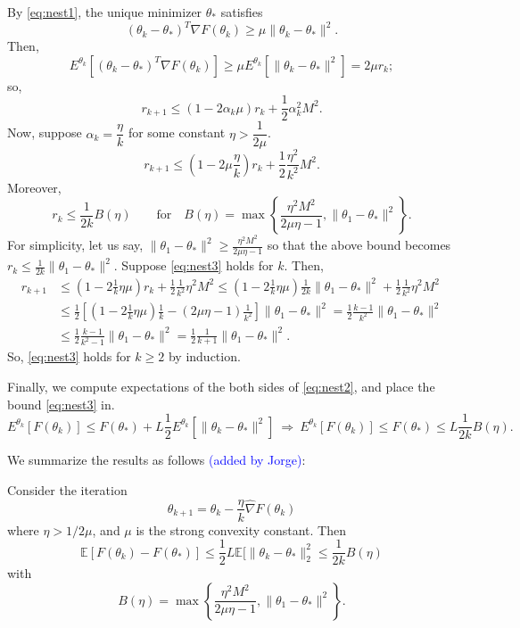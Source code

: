 \documentclass[12pt]{article}
\begin{document}
\noindent
By \eqref{eq:nest1}, the unique minimizer $\theta_\ast$ satisfies
\[
 (\theta_k - \theta_\ast)^T\nabla F(\theta_k) \geq \mu\|\theta_k - \theta_\ast\|^2.
\]
Then,
\[
 E^{\theta_k}[(\theta_k-\theta_\ast)^T\nabla F(\theta_k)] \geq \mu E^{\theta_k}[\|\theta_k - \theta_\ast\|^2] = 2\mu r_k;
\]
so,
\[
 r_{k+1} \leq (1-2\alpha_k\mu)r_k + \frac{1}{2}\alpha_k^2M^2.
\]
Now, suppose $\alpha_k = \dfrac{\eta}{k}$ for some constant $\eta > \dfrac{1}{2\mu}$. 
\[
 r_{k+1} \leq (1-2\mu\frac{\eta}{k})r_k + \frac{1}{2}\frac{\eta^2}{k^2}M^2.
\]
Moreover, 
\begin{equation}
r_k\leq \frac{1}{2k}B(\eta) \qquad\mbox{for} \quad B(\eta)=\max\left\lbrace\frac{\eta^2M^2}{2\mu\eta-1},\|\theta_1-\theta_\ast\|^2\right\rbrace.
\label{eq:nest3}
\end{equation}
For simplicity, let us say, $\|\theta_1-\theta_\ast\|^2 \geq \frac{\eta^2M^2}{2\mu\eta-1}$ so that the above bound becomes $r_k\leq \frac{1}{2k}\|\theta_1-\theta_\ast\|^2$.  Suppose \eqref{eq:nest3} holds for $k$.  Then,
\begin{align*}
 r_{k+1} &\leq (1-2\frac{1}{k}\eta\mu)r_k + \frac{1}{2}\frac{1}{k^2}\eta^2M^2 \leq (1-2\frac{1}{k}\eta\mu)\frac{1}{2k}\|\theta_1-\theta_\ast\|^2 + \frac{1}{2}\frac{1}{k^2}\eta^2M^2 \\
 &\leq \frac{1}{2}\left[(1-2\frac{1}{k}\eta\mu)\frac{1}{k}-(2\mu\eta-1)\frac{1}{k^2}\right]\|\theta_1-\theta_\ast\|^2 = \frac{1}{2}\frac{k-1}{k^2}\|\theta_1-\theta_\ast\|^2 \\
 &\leq \frac{1}{2} \frac{k-1}{k^2-1} \|\theta_1-\theta_\ast\|^2 = \frac{1}{2} \frac{1}{k+1} \|\theta_1-\theta_\ast\|^2.
\end{align*}
So, \eqref{eq:nest3} holds for $k\geq 2$ by induction.  

\noindent
Finally, we compute expectations of the both sides of \eqref{eq:nest2}, and place the bound \eqref{eq:nest3} in.
\[
 E^{\theta_k}[F(\theta_k)] \leq F(\theta_\ast) + L\frac{1}{2}E^{\theta_k}[\|\theta_k-\theta_\ast\|^2] \ \Rightarrow \ E^{\theta_k}[F(\theta_k)] \leq F(\theta_\ast) \leq L \frac{1}{2k}B(\eta).
\]
\bigskip

We summarize the results as follows \textcolor{blue}{(added by Jorge)}:
\begin{theorem}
Consider the iteration
\[    \theta_{k+1}= \theta_k - \frac{\eta}{k} \hat \nabla F(\theta_k)\]
where $\eta > 1/2\mu$, and $\mu$ is the strong convexity constant. Then
\[
   \mathbb{E}[F(\theta_k) - F(\theta_*)] \leq \frac{1}{2} L \mathbb{E}[ \| \theta_k - \theta_* \|_2^2 
   \leq \frac{1}{2 k} B(\eta)
   \]
   with
   \[
   B(\eta)=\max\left\lbrace\frac{\eta^2M^2}{2\mu\eta-1},\|\theta_1-\theta_\ast\|^2\right\rbrace.
   \]
\end{theorem}
\medskip
\end{document}
